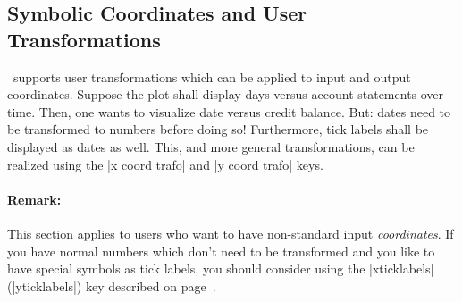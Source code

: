 

\subsection{Symbolic Coordinates and User Transformations}
\label{pgfplots:sec:symbolic:coords}
\PGFPlots\ supports user transformations which can be applied to input and output coordinates. Suppose the plot shall display days versus account statements over time. Then, one wants to visualize date versus credit balance. But: dates need to be transformed to numbers before doing so! Furthermore, tick labels shall be displayed as dates as well. This, and more general transformations, can be realized using the |x coord trafo| and |y coord trafo| keys.

\paragraph{Remark:} This section applies to users who want to have non-standard input \emph{coordinates}. If you have normal numbers which don't need to be transformed and you like to have special symbols as tick labels, you should consider using the |xticklabels| (|yticklabels|) key described on page~\pageref{pgfplots:key:xticklabels}.

